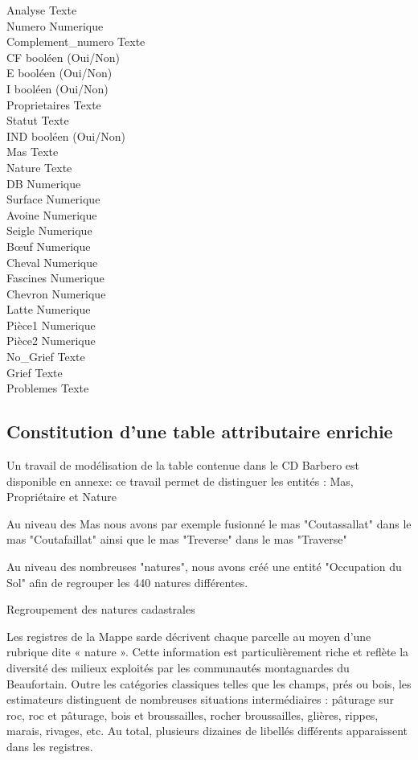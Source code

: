 \documentclass[12pt,a4paper]{report}
\begin{document}
Analyse	Texte\\
Numero	Numerique\\
Complement_numero	Texte\\
CF	booléen (Oui/Non)\\
E	booléen (Oui/Non)\\
I	booléen (Oui/Non)\\
Proprietaires	Texte\\
Statut	Texte\\
IND	booléen (Oui/Non)\\
Mas	Texte\\
Nature	Texte\\
DB	Numerique\\
Surface	Numerique\\
Avoine	Numerique\\
Seigle	Numerique\\
Bœuf	Numerique\\
Cheval	Numerique\\
Fascines	Numerique\\
Chevron	Numerique\\
Latte	Numerique\\
Pièce1	Numerique\\
Pièce2	Numerique\\
No_Grief	Texte\\
Grief	Texte\\
Problemes	Texte\\

\subsection{Constitution d’une table attributaire enrichie}

Un travail de modélisation de la table contenue dans le CD Barbero est disponible en annexe: ce travail permet de distinguer les entités : Mas, Propriétaire et Nature

Au niveau des Mas nous avons par exemple fusionné le mas "Coutassallat" dans le mas "Coutafaillat" ainsi que le mas "Treverse" dans le mas "Traverse"

Au niveau des nombreuses "natures", nous avons créé une entité "Occupation du Sol" afin de regrouper les 440 natures différentes.

Regroupement des natures cadastrales

Les registres de la Mappe sarde décrivent chaque parcelle au moyen d'une rubrique dite « nature ». Cette information est particulièrement riche et reflète la diversité des milieux exploités par les communautés montagnardes du Beaufortain. Outre les catégories classiques telles que les champs, prés ou bois, les estimateurs distinguent de nombreuses situations intermédiaires : pâturage sur roc, roc et pâturage, bois et broussailles, rocher broussailles, glières, rippes, marais, rivages, etc. Au total, plusieurs dizaines de libellés différents apparaissent dans les registres.
\end{document}
